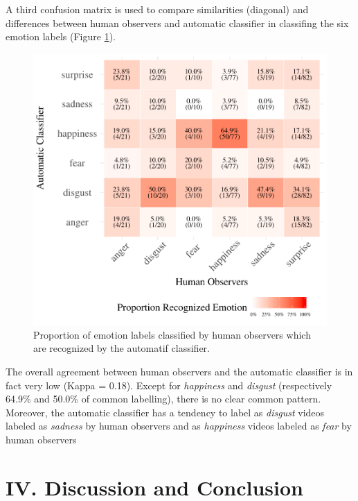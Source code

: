 \documentclass[conference,final,]{IEEEtran}
\makeatletter
\def\maxwidth{\ifdim\Gin@nat@width>\linewidth\linewidth
\else\Gin@nat@width\fi}
\let\Oldincludegraphics\includegraphics
\renewcommand{\includegraphics}[1]{\Oldincludegraphics[width=\maxwidth]{#1}}
\makeatother
\begin{document}
A third confusion matrix is used to compare similarities (diagonal) and
differences between human observers and automatic classifier in
classifing the six emotion labels (Figure
\nolinebreak \ref{fig:confusionMatrix_hr_ar}).

\begin{figure}
\centering
\includegraphics{ACII_2019_paper_files/figure-latex/confusionMatrix_hr_ar-1.pdf}
\caption{\label{fig:confusionMatrix_hr_ar}Proportion of emotion labels
classified by human observers which are recognized by the automatif
classifier.}
\end{figure}

The overall agreement between human observers and the automatic
classifier is in fact very low (Kappa = 0.18). Except for
\emph{happiness} and \emph{disgust} (respectively 64.9\% and 50.0\% of
common labelling), there is no clear common pattern. Moreover, the
automatic classifier has a tendency to label as \emph{disgust} videos
labeled as \emph{sadness} by human observers and as \emph{happiness}
videos labeled as \emph{fear} by human observers

\hypertarget{iv.-discussion-and-conclusion}{%
\section{IV. Discussion and
Conclusion}\label{iv.-discussion-and-conclusion}}
\end{document}
